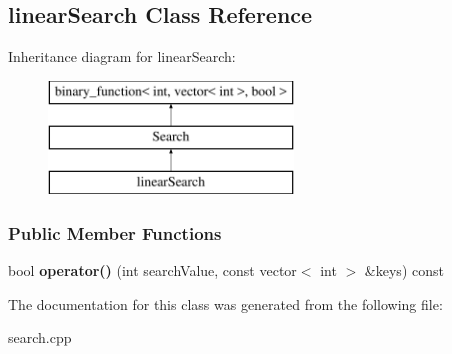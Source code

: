 \hypertarget{classlinear_search}{}\subsection{linear\+Search Class Reference}
\label{classlinear_search}
Inheritance diagram for linear\+Search\+:\begin{figure}[H]
\begin{center}
\leavevmode
\includegraphics[height=3.000000cm]{classlinear_search}
\end{center}
\end{figure}
\subsubsection*{Public Member Functions}
\begin{DoxyCompactItemize}
\item 
bool {\bfseries operator()} (int search\+Value, const vector$<$ int $>$ \&keys) const \hypertarget{classlinear_search_a447bc4f724457f1786dc36c10626bfa8}{}\label{classlinear_search_a447bc4f724457f1786dc36c10626bfa8}

\end{DoxyCompactItemize}


The documentation for this class was generated from the following file\+:\begin{DoxyCompactItemize}
\item 
search.\+cpp\end{DoxyCompactItemize}
